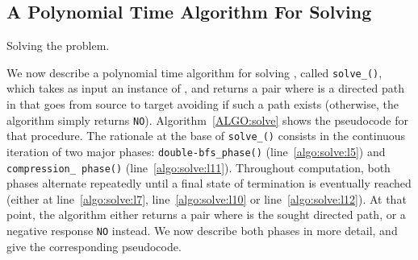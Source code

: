 \subsection{A Polynomial Time Algorithm For Solving \mainproblem}\label{sect:st-dPaths}

\begin{algorithm}[t]
\caption{Solving the \texttt{\mainproblem} problem.}\label{ALGO:solve}
\DontPrintSemicolon
\nonl {}
\footnotesize
{}
\end{algorithm}
We now describe a polynomial time algorithm for solving {\mainproblem}, called
\texttt{solve\_\mainproblem()}, which
takes as input an instance  of \mainproblem, and
returns a pair  where  is a directed path in  that goes from source  to target 
avoiding  if such a path exists (otherwise, the algorithm simply returns \texttt{NO}).
Algorithm~\ref{ALGO:solve} shows the pseudocode for that procedure.
The rationale at the base of \texttt{solve\_\mainproblem()} consists in the continuous iteration of two major phases:
\texttt{double-bfs\_phase()} (line~\ref{algo:solve:l5})
and
\texttt{compression\_ phase()} (line~\ref{algo:solve:l11}).
Throughout computation, both phases alternate repeatedly
until a final state of termination is eventually reached
(either at line~\ref{algo:solve:l7}, line~\ref{algo:solve:l10} or line~\ref{algo:solve:l12}).
At that point, the algorithm either returns a pair  where  is the sought directed path, or a negative response \texttt{NO} instead.
We now describe both phases in more detail, and give the corresponding pseudocode.

